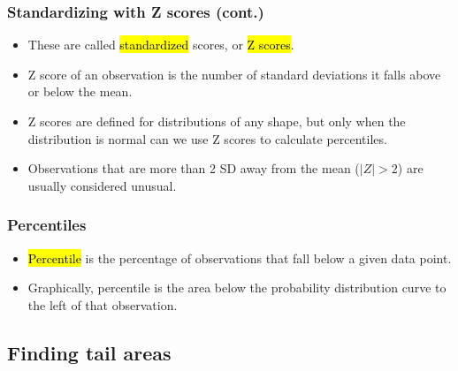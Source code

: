 \documentclass[slidestop,compress,mathserif]{beamer}
\begin{document}

\begin{frame}
\frametitle{Standardizing with Z scores (cont.)}

\begin{itemize}

\item These are called \hl{standardized} scores, or \hl{Z scores}.

\item Z score of an observation is the number of standard deviations it falls above or below the mean.
\formula{\[Z = \frac{observation - mean}{SD}\]}

\item Z scores are defined for distributions of any shape, but only when the distribution is normal can we use Z scores to calculate percentiles.

\item Observations that are more than 2 SD away from the mean ($|Z| > 2$) are usually considered unusual.

\end{itemize}

\end{frame}


\begin{frame}
\frametitle{Percentiles}

\begin{itemize}

\item \hl{Percentile} is the percentage of observations that fall below a given data point. 

\item Graphically, percentile is the area below the probability distribution curve to the left of that observation.

\end{itemize}

\begin{center}
\end{center}

\end{frame}

\subsection{Finding tail areas}
\end{document}
